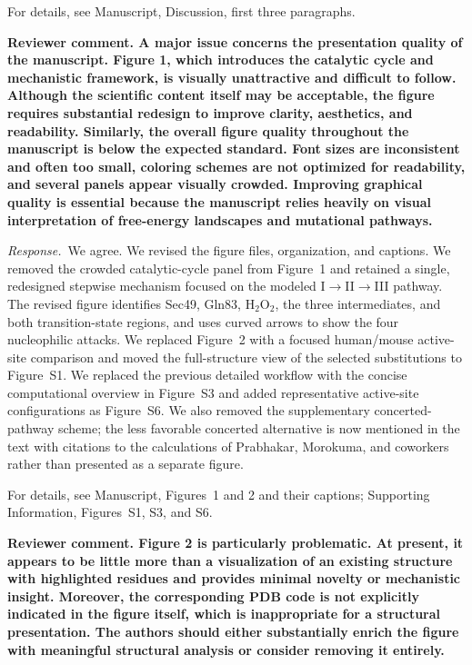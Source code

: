 \documentclass[11pt]{article}
\newcommand{\ReviewerComment}[1]{\par\noindent\textbf{Reviewer comment. #1}\par}
\newcommand{\AuthorResponse}{\par\noindent\textit{Response.}\ }
\newcommand{\Location}[1]{\par\noindent For details, see #1\par}
\begin{document}
\Location{Manuscript, Discussion, first three paragraphs.}

\ReviewerComment{A major issue concerns the presentation quality of the manuscript. Figure 1, which introduces the catalytic cycle and mechanistic framework, is visually unattractive and difficult to follow. Although the scientific content itself may be acceptable, the figure requires substantial redesign to improve clarity, aesthetics, and readability. Similarly, the overall figure quality throughout the manuscript is below the expected standard. Font sizes are inconsistent and often too small, coloring schemes are not optimized for readability, and several panels appear visually crowded. Improving graphical quality is essential because the manuscript relies heavily on visual interpretation of free-energy landscapes and mutational pathways.}

\AuthorResponse We agree. We revised the figure files, organization, and captions.
We removed the crowded catalytic-cycle panel from Figure~1 and retained a single,
redesigned stepwise mechanism focused on the modeled I$\rightarrow$II$\rightarrow$III
pathway. The revised figure identifies Sec49, Gln83, H$_2$O$_2$, the three intermediates,
and both transition-state regions, and uses curved arrows to show the four nucleophilic
attacks. We replaced Figure~2 with a focused
human/mouse active-site comparison and moved the full-structure view of the selected
substitutions to Figure~S1. We replaced the previous detailed workflow with the concise
computational overview in Figure~S3 and added representative active-site configurations
as Figure~S6. We also removed the supplementary concerted-pathway scheme; the less
favorable concerted alternative is now mentioned in the text with citations to the
calculations of Prabhakar, Morokuma, and coworkers rather than presented as a separate
figure.

\Location{Manuscript, Figures~1 and 2 and their captions; Supporting Information, Figures~S1, S3, and S6.}

\ReviewerComment{Figure 2 is particularly problematic. At present, it appears to be little more than a visualization of an existing structure with highlighted residues and provides minimal novelty or mechanistic insight. Moreover, the corresponding PDB code is not explicitly indicated in the figure itself, which is inappropriate for a structural presentation. The authors should either substantially enrich the figure with meaningful structural analysis or consider removing it entirely.}
\end{document}
